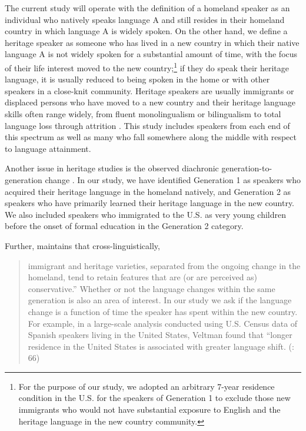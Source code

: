 \documentclass[output=paper,modfonts,nonflat,
]{langsci/langscibook}
\begin{document}
The current study will operate with the definition of a homeland speaker as an individual who natively speaks language A and still resides in their homeland country in which language A is widely spoken. On the other hand, we define a heritage speaker as someone who has lived in a new country in which their native language A is not widely spoken for a substantial amount of time, with the focus of their life interest moved to the new country;\footnote{For the purpose of our study, we adopted an arbitrary 7-year residence condition in the U.S. for the speakers of Generation 1 to exclude those new immigrants who would not have substantial exposure to English and the heritage language in the new country community.} if they do speak their heritage language, it is usually reduced to being spoken in the home or with other speakers in a close-knit community. Heritage speakers are usually immigrants or displaced persons who have moved to a new country and their heritage language skills often range widely, from fluent monolingualism or bilingualism to total language loss through attrition \citep{ScontrasEtAl2015}. This study includes speakers from each end of this spectrum as well as many who fall somewhere along the middle with respect to language attainment.



Another issue in heritage studies is the observed diachronic generation-to-generation change \citep{OtheguyEtAl2007}. In our study, we have identified Generation 1 as speakers who acquired their heritage language in the homeland natively, and Generation 2 as speakers who have primarily learned their heritage language in the new country. We also included speakers who immigrated to the U.S. as very young children before the onset of formal education in the Generation 2 category.



Further, \citet{Polinskyinprep} maintains that cross-linguistically, 
\begin{quote}
 
immigrant and heritage varieties, separated from the ongoing change in the homeland, tend to retain features that are (or are perceived as) conservative.” Whether or not the language changes within the same generation is also an area of interest. In our study we ask if the language change is a function of time the speaker has spent within the new country. For example, in a large-scale analysis conducted using U.S. Census data of Spanish speakers living in the United States, Veltman found that “longer residence in the United States is associated with greater language shift. (\citeyear*{Polinsky2000}: 66)
\end{quote}
\end{document}
